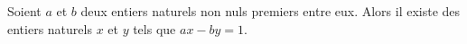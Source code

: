 Soient $a$ et $b$ deux entiers naturels non nuls premiers entre eux. Alors il
existe des entiers naturels $x$ et $y$ tels que $ax - by = 1$.
